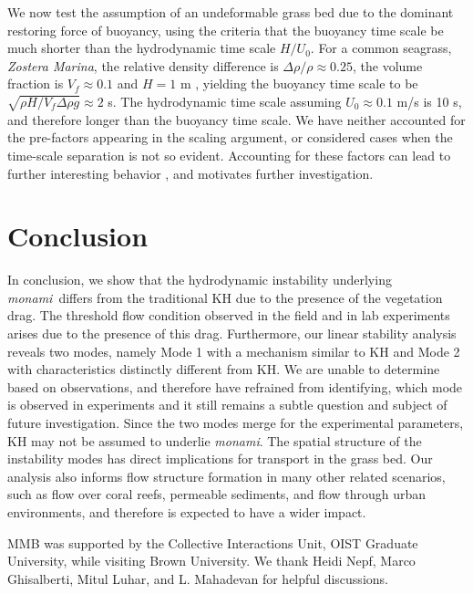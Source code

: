\documentclass{jfm}
\newcommand{\monami}{\textit{monami}}
\newcommand{\revise}[1]{{{#1}}}
\begin{document}
\revise{
We now test the assumption of an undeformable grass bed due to the dominant restoring force of buoyancy, using the criteria that the buoyancy time scale be much shorter than the hydrodynamic time scale $H/U_0$.
For a common seagrass, \textit{Zostera Marina}, the relative density difference is $\Delta \rho /\rho \approx 0.25$, the volume fraction is $V_f \approx 0.1$ and $H=1$ m \citep{Fonseca98}, yielding the buoyancy time scale to be $\sqrt{\rho H/V_f \Delta \rho g} \approx 2$ s.
The hydrodynamic time scale assuming $U_0 \approx 0.1$ m/s is 10 s, and therefore longer than the buoyancy time scale.
We have neither accounted for the pre-factors appearing in the scaling argument, or considered cases when the time-scale separation is not so evident. 
Accounting for these factors  can lead to further interesting behavior \citep{Delangre06,Gosselin2009}, and motivates further investigation.
}

\section{Conclusion}
In conclusion, we show that the hydrodynamic instability underlying \monami ~differs from the traditional KH due to the presence of the vegetation drag. 
The threshold flow condition observed in the field and in lab experiments arises due to the presence of this drag. 
Furthermore, our linear stability analysis reveals two modes, namely Mode 1 with a mechanism similar to KH and Mode 2 with characteristics distinctly different from KH. 
\revise{
We are unable to determine based on observations, and therefore have refrained from identifying, which mode is observed in experiments and it still remains a subtle question and subject of future investigation. 
Since the two modes merge for the experimental parameters, KH may not be assumed to underlie \monami.
}
The spatial structure of the instability modes has direct implications for transport in the grass bed.
Our analysis also informs flow structure formation in many other related scenarios, such as flow over coral reefs, permeable sediments, and flow through urban environments, and therefore is expected to have a wider impact.

\acknowledgments
MMB was supported by the Collective Interactions Unit, OIST Graduate University, while visiting Brown University. We thank Heidi Nepf, Marco Ghisalberti, Mitul Luhar, and L. Mahadevan for helpful discussions.


% 
\end{document}
